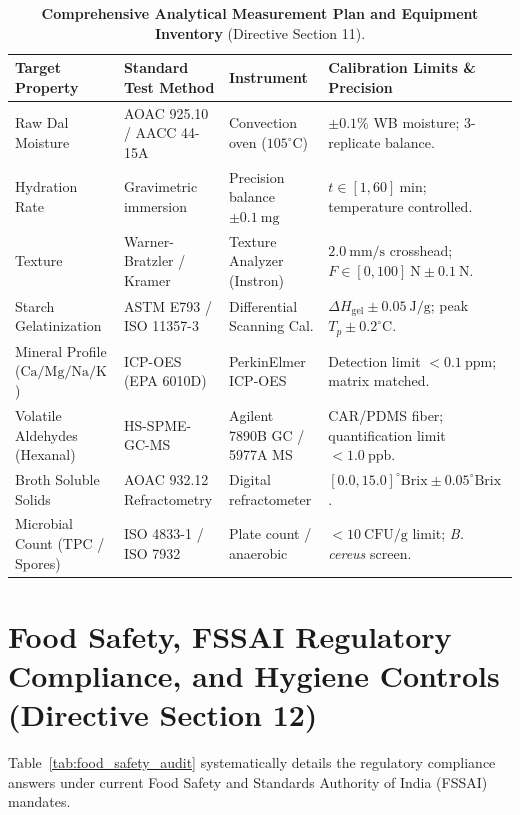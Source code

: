 \documentclass[10pt,a4paper]{article}
\begin{document}
\begin{table}[H]
\centering
\footnotesize
\setlength{\tabcolsep}{3.0pt}
\caption{\textbf{Comprehensive Analytical Measurement Plan and Equipment Inventory} (Directive Section 11).}
\label{tab:analytical_plan}
\begin{tabularx}{\linewidth}{p{3.2cm}p{3.8cm}p{2.5cm}>{\raggedright\arraybackslash}X}
\toprule
\textbf{Target Property} & \textbf{Standard Test Method} & \textbf{Instrument} & \textbf{Calibration Limits \& Precision} \\
\midrule
Raw Dal Moisture & AOAC 925.10 / AACC 44-15A & Convection oven ($105^\circ\mathrm{C}$) & $\pm 0.1\%$ WB moisture; 3-replicate balance. \\
Hydration Rate & Gravimetric immersion & Precision balance $\pm 0.1\ \mathrm{mg}$ & $t \in [1, 60]\ \mathrm{min}$; temperature controlled. \\
Texture & Warner-Bratzler / Kramer & Texture Analyzer (Instron) & $2.0\ \mathrm{mm/s}$ crosshead; $F \in [0, 100]\ \mathrm{N} \pm 0.1\ \mathrm{N}$. \\
Starch Gelatinization & ASTM E793 / ISO 11357-3 & Differential Scanning Cal. & $\Delta H_{\mathrm{gel}} \pm 0.05\ \mathrm{J/g}$; peak $T_p \pm 0.2^\circ\mathrm{C}$. \\
Mineral Profile ($\mathrm{Ca/Mg/Na/K}$) & ICP-OES (EPA 6010D) & PerkinElmer ICP-OES & Detection limit $< 0.1\ \mathrm{ppm}$; matrix matched. \\
Volatile Aldehydes (Hexanal) & HS-SPME-GC-MS & Agilent 7890B GC / 5977A MS & CAR/PDMS fiber; quantification limit $< 1.0\ \mathrm{ppb}$. \\
Broth Soluble Solids & AOAC 932.12 Refractometry & Digital refractometer & $[0.0, 15.0]^\circ\mathrm{Brix} \pm 0.05^\circ\mathrm{Brix}$. \\
Microbial Count (TPC / Spores) & ISO 4833-1 / ISO 7932 & Plate count / anaerobic & $< 10\ \mathrm{CFU/g}$ limit; \textit{B. cereus} screen. \\
\bottomrule
\end{tabularx}
\end{table}

\section{Food Safety, FSSAI Regulatory Compliance, and Hygiene Controls (Directive Section 12)}
Table~\ref{tab:food_safety_audit} systematically details the regulatory compliance answers under current Food Safety and Standards Authority of India (FSSAI) mandates.
\end{document}
